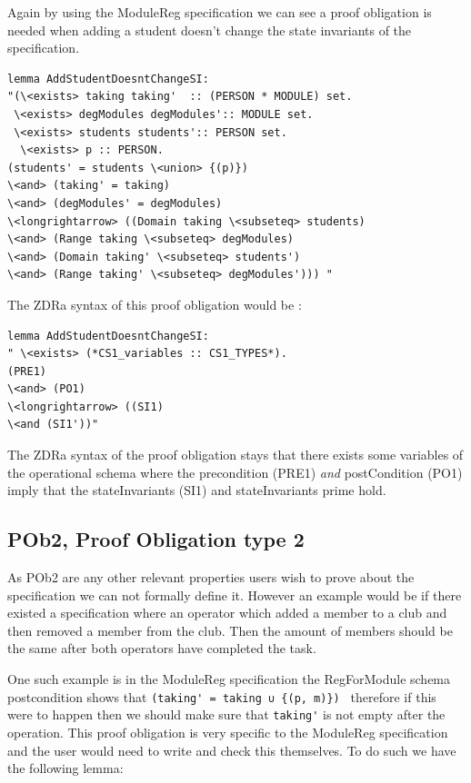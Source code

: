 Again by using the ModuleReg specification we can see a proof obligation is
needed when adding a student doesn't change the state invariants of the
specification.

\begin{verbatim}
lemma AddStudentDoesntChangeSI:
"(\<exists> taking taking'  :: (PERSON * MODULE) set.
 \<exists> degModules degModules':: MODULE set.
 \<exists> students students':: PERSON set.
  \<exists> p :: PERSON.
(students' = students \<union> {(p)}) 
\<and> (taking' = taking)
\<and> (degModules' = degModules)
\<longrightarrow> ((Domain taking \<subseteq> students)
\<and> (Range taking \<subseteq> degModules)
\<and> (Domain taking' \<subseteq> students')
\<and> (Range taking' \<subseteq> degModules'))) "
\end{verbatim}

The ZDRa syntax of this proof obligation would be :

\begin{verbatim}
lemma AddStudentDoesntChangeSI:
" \<exists> (*CS1_variables :: CS1_TYPES*).
(PRE1)
\<and> (PO1)
\<longrightarrow> ((SI1)
\<and (SI1'))"
\end{verbatim}

 The ZDRa syntax of the proof obligation stays that there exists some variables
 of the operational schema where the precondition (PRE1) \emph{and}
 postCondition (PO1) imply that the stateInvariants (SI1) and stateInvariants
 prime hold.

\subsection{POb2, Proof Obligation type 2}

As POb2 are any other relevant properties users wish to prove about the
specification we can not formally define it. However an example would be if
there existed a specification where an operator which added a member to a club
and then removed a member from the club. Then the amount of members should be
the same after both operators have completed the task.

One such example is in the ModuleReg specification the RegForModule schema
postcondition shows that \verb|(taking' = taking ∪ {(p, m)}) | therefore if this
were to happen then we should make sure that \verb|taking'| is not empty after
the operation. This proof obligation is very specific to the ModuleReg
specification and the user would need to write and check this themselves. To do
such we have the following lemma:

